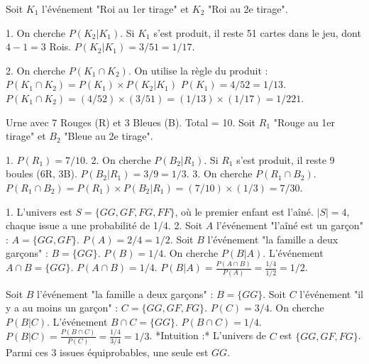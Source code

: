 \begin{correctionbox}
Soit $K_1$ l'événement "Roi au 1er tirage" et $K_2$ "Roi au 2e tirage".

1.  On cherche $P(K_2|K_1)$. Si $K_1$ s'est produit, il reste 51 cartes dans le jeu, dont $4-1=3$ Rois.
    $P(K_2|K_1) = 3/51 = 1/17$.

2.  On cherche $P(K_1 \cap K_2)$. On utilise la règle du produit :
    $P(K_1 \cap K_2) = P(K_1) \times P(K_2|K_1)$
    $P(K_1) = 4/52 = 1/13$.
    $P(K_1 \cap K_2) = (4/52) \times (3/51) = (1/13) \times (1/17) = 1/221$.
\end{correctionbox}

\begin{correctionbox}
Urne avec 7 Rouges (R) et 3 Bleues (B). Total = 10.
Soit $R_1$ "Rouge au 1er tirage" et $B_2$ "Bleue au 2e tirage".

1.  $P(R_1) = 7/10$.
2.  On cherche $P(B_2|R_1)$. Si $R_1$ s'est produit, il reste 9 boules (6R, 3B).
    $P(B_2|R_1) = 3/9 = 1/3$.
3.  On cherche $P(R_1 \cap B_2)$.
    $P(R_1 \cap B_2) = P(R_1) \times P(B_2|R_1) = (7/10) \times (1/3) = 7/30$.
\end{correctionbox}

\begin{correctionbox}
1.  L'univers est $S = \{GG, GF, FG, FF\}$, où le premier enfant est l'aîné. $|S|=4$, chaque issue a une probabilité de 1/4.
2.  Soit $A$ l'événement "l'aîné est un garçon" : $A = \{GG, GF\}$. $P(A) = 2/4 = 1/2$.
    Soit $B$ l'événement "la famille a deux garçons" : $B = \{GG\}$. $P(B) = 1/4$.
    On cherche $P(B|A)$. L'événement $A \cap B = \{GG\}$. $P(A \cap B) = 1/4$.
    $P(B|A) = \frac{P(A \cap B)}{P(A)} = \frac{1/4}{1/2} = 1/2$.
\end{correctionbox}

\begin{correctionbox}
Soit $B$ l'événement "la famille a deux garçons" : $B = \{GG\}$.
Soit $C$ l'événement "il y a au moins un garçon" : $C = \{GG, GF, FG\}$. $P(C) = 3/4$.
On cherche $P(B|C)$.
L'événement $B \cap C = \{GG\}$. $P(B \cap C) = 1/4$.
$P(B|C) = \frac{P(B \cap C)}{P(C)} = \frac{1/4}{3/4} = 1/3$.
*Intuition :* L'univers de $C$ est $\{GG, GF, FG\}$. Parmi ces 3 issues équiprobables, une seule est $GG$.
\end{correctionbox}

